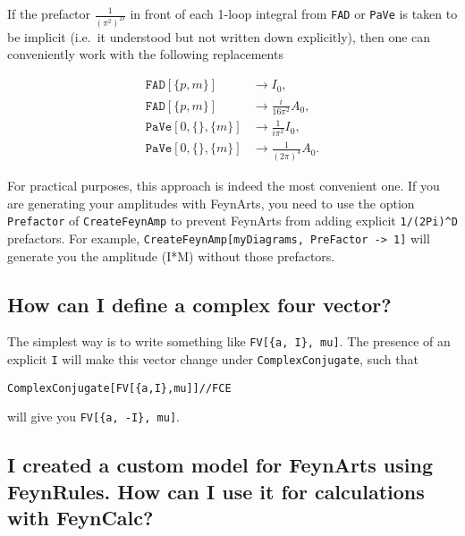 \documentclass[../FeynCalcManual.tex]{subfiles}
\begin{document}
If the prefactor \(\frac{1}{(\pi^2)^D}\) in front of each 1-loop
integral from \texttt{FAD} or \texttt{PaVe} is taken to be implicit
(i.e.~it understood but not written down explicitly), then one can
conveniently work with the following replacements

\begin{align*}
\mathtt{FAD}[\{p,m\}] &\to I_0, \\
\mathtt{FAD}[\{p,m\}] &\to \frac{i}{16 \pi^2} A_0, \\
\mathtt{PaVe}[0, \{\}, \{m\}] &\to \frac{1}{i \pi^2} I_0, \\
\mathtt{PaVe}[0, \{\}, \{m\}] &\to \frac{1}{(2 \pi)^4} A_0.
\end{align*}

For practical purposes, this approach is indeed the most convenient one.
If you are generating your amplitudes with FeynArts, you need to use the
option \texttt{Prefactor} of \texttt{CreateFeynAmp} to prevent FeynArts
from adding explicit \texttt{1/(2Pi)^D} prefactors. For example,
\texttt{CreateFeynAmp[\allowbreak{}myDiagrams,\ \allowbreak{}PreFactor -> 1]}
will generate you the amplitude (I*M) without those prefactors.

\hypertarget{how-can-i-define-a-complex-four-vector}{%
\subsection{How can I define a complex four
vector?}\label{how-can-i-define-a-complex-four-vector}}

The simplest way is to write something like
\texttt{FV[\allowbreak{}\{\allowbreak{}a,\ \allowbreak{}I\},\ \allowbreak{}mu]}.
The presence of an explicit \texttt{I} will make this vector change
under \texttt{ComplexConjugate}, such that

\begin{verbatim}
ComplexConjugate[FV[{a,I},mu]]//FCE
\end{verbatim}

will give you
\texttt{FV[\allowbreak{}\{\allowbreak{}a,\ \allowbreak{}-I\},\ \allowbreak{}mu]}.

\hypertarget{i-created-a-custom-model-for-feynarts-using-feynrules.-how-can-i-use-it-for-calculations-with-feyncalc}{%
\subsection{I created a custom model for FeynArts using FeynRules. How
can I use it for calculations with
FeynCalc?}\label{i-created-a-custom-model-for-feynarts-using-feynrules.-how-can-i-use-it-for-calculations-with-feyncalc}}
\end{document}
